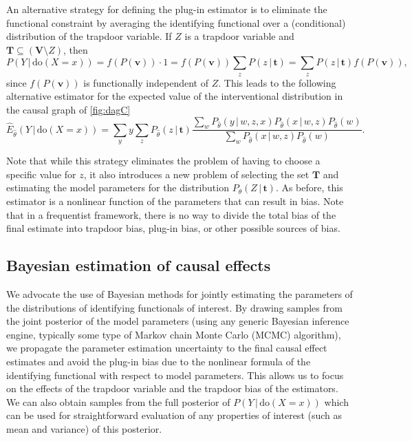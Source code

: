 \documentclass[11pt,a4paper,twoside]{article}
\newcommand{\+}[1]{\ensuremath{\mathbf{#1}}}
\newcommand{\doo}{\textrm{do}}
\newcommand{\given}{{ \, | \, }}
\begin{document}
	An alternative strategy for defining the plug-in estimator is to eliminate the functional constraint by averaging the identifying functional over a (conditional) distribution of the trapdoor variable. If $Z$ is a trapdoor variable and $\+ T \subseteq (\+ V \setminus Z)$, then
	\[
	P(Y \given \doo(X = x)) = f(P(\+ v)) \cdot 1 = f(P(\+ v)) \sum_{z} P(z \given \+ t) = \sum_{z} P(z \given \+ t) f(P(\+ v)),
	\]
	since $f(P(\+ v))$ is functionally independent of $Z$. This leads to the following alternative estimator for the expected value of the interventional distribution in the causal graph of \autoref{fig:dagC}
	\begin{equation} \label{eq:plugin2}
	\widehat E_{\hat \theta}(Y \given \doo(X = x)) = \sum_{y}y\sum_{z} P_{\hat \theta}(z \given \+ t) \frac{\sum_{w}P_{\hat \theta}(y \given w, z, x)P_{\hat \theta}(x \given  w, z) P_{\hat \theta}(w)}{\sum_{w}P_{\hat \theta}(x \given  w, z) P_{\hat \theta}(w)}.
	\end{equation}

	Note that while this strategy eliminates the problem of having to choose a specific value for $z$, it also introduces a new problem of selecting the set $\+ T$ and estimating the model parameters for the distribution $P_{\theta}(Z \given \+ t)$. As before, this estimator is a nonlinear function of the parameters that can result in bias. Note that in a frequentist framework, there is no way to divide the total bias of the final estimate into trapdoor bias, plug-in bias, or other possible sources of bias.
	
	\subsection{Bayesian estimation of causal effects}
	
	We advocate the use of Bayesian methods for jointly estimating the parameters of the distributions of identifying functionals of interest. By drawing samples from the joint posterior of the model parameters (using any generic Bayesian inference engine, typically some type of Markov chain Monte Carlo (MCMC) algorithm), we propagate the parameter estimation uncertainty to the final causal effect estimates and avoid the plug-in bias due to the nonlinear formula of the identifying functional with respect to model parameters. This allows us to focus on the effects of the trapdoor variable and the trapdoor bias of the estimators. We can also obtain samples from the full posterior of $P(Y \given \doo(X = x))$ which can be used for straightforward evaluation of any properties of interest (such as mean and variance) of this posterior. 
	
\end{document}
